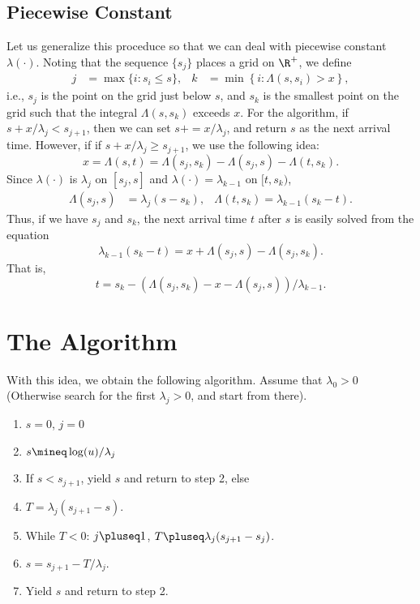 \documentclass[a4paper]{article}
\begin{document}
\subsection{Piecewise Constant}
\label{sec:orgedb2160}

Let us generalize this proceduce so that we can deal with  piecewise constant  \(\lambda(\cdot)\).
Noting that the sequence \(\{s_{j}\}\) places a grid on \(\R^{+}\), we define
\begin{align*}
j &= \max\{i: s_{i} \leq s\}, & k &=\min\left\{i : \Lambda(s, s_{i})  >x\right\},
\end{align*}
i.e., \(s_{j}\) is the point on the grid just below \(s\), and \(s_{k}\) is the smallest point on the grid such that the integral \(\Lambda(s, s_{k})\) exceeds \(x\).
For the algorithm, if \(s+x/\lambda_{j}< s_{j+1}\), then we can set \(s += x/\lambda_{j}\), and return \(s\) as the next arrival time.
However, if if \(s+x/\lambda_{j}\geq s_{j+1}\), we use the following idea:
\begin{equation*}
x = \Lambda(s, t) = \Lambda(s_{j}, s_{k}) - \Lambda(s_{j}, s) - \Lambda(t, s_{k}).
\end{equation*}
Since \(\lambda(\cdot)\) is \(\lambda_{j}\) on \([s_{j}, s]\) and \(\lambda(\cdot) = \lambda_{k-1}\) on \([t, s_{k})\),
\begin{align*}
\Lambda(s_{j}, s) &= \lambda_{j}(s-s_{k}),  & \Lambda(t, s_{k}) = \lambda_{k-1} (s_{k}-t).
\end{align*}
Thus, if we have \(s_{j}\) and \(s_{k}\), the next arrival time \(t\) after \(s\) is easily  solved from the equation
\begin{equation*}
\lambda_{k-1}(s_{k} -t ) = x +  \Lambda(s_{j}, s) - \Lambda(s_{j}, s_{k}).
\end{equation*}
That is,
\begin{equation}\label{eq:nh8}
t = s_{k } -  (\Lambda(s_{j}, s_{k}) - x -  \Lambda(s_{j}, s) )/\lambda_{k-1}.
\end{equation}
\section{The Algorithm}
\label{sec:org7cfc631}

With this idea, we obtain the following algorithm. Assume that \(\lambda_{0} > 0\) (Otherwise search for the first \(\lambda_{j}>0\), and start from there).

\begin{enumerate}
\item \(s=0\), \(j=0\)
\item \(s \mineq \log(u)/\lambda_{j}\)
\item If \(s < s_{j+1}\), yield \(s\) and return to step 2, else
\item \(T = \lambda_{j}(s_{j+1}-s)\).
\item While \(T<0\): \(j \pluseq 1\), \(T \pluseq \lambda_{j}(s_{j+1}-s_{j})\).
\item \(s = s_{j+1} - T/\lambda_{j}\).
\item Yield \(s\) and return to step 2.
\end{enumerate}
\end{document}
